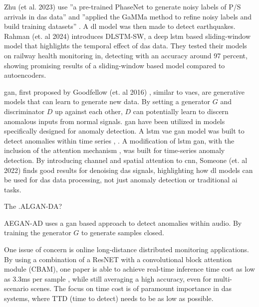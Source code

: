 Zhu (et al. 2023) use ''a pre-trained PhaseNet to generate noisy labels of P/S arrivals in \acrshort{das} data'' and ''applied the GaMMa method to refine noisy labels and build training datasets'' \cite{zhu2023seismic}. A \acrshort{dl} model was then made to detect earthquakes. \\

Rahman (et. al 2024) \cite{10.1115/JRC2024-124137} introduces DLSTM-SW, a deep \acrfull{lstm} based sliding-window model that highlights the temporal effect of \acrshort{das} data. They tested their models on railway health monitoring in, detecting with an accuracy around 97 percent, showing promising results of a sliding-window based model compared to autoencoders.

\acrshort{gan}, first proposed by Goodfellow (et. al 2016) \cite{goodfellow2016nips}, similar to \acrshort{vae}s, are generative models that can learn to generate new data. By setting a generator $G$ and discriminator $D$ up against each other, $D$ can potentially learn to discern anomalous inputs from normal signals. \acrshort{gan} have been utilized in models specifically designed for anomaly detection. A \acrshort{lstm} \acrshort{vae} \acrshort{gan} model was built to detect anomalies within time series \cite{s20133738}, .  A modification of \acrshort{lstm} \acrshort{gan}, with the inclusion of the attention mechanism \cite{vaswani2017attention}, was built for time-series anomaly detection. By introducing channel and spatial attention to \acrshort{cnn}, Someone (et. al 2022) \cite{eage:/content/journals/10.1111/1365-2478.13355} finds good results for denoising \acrshort{das} signals, highlighting how \acrshort{dl} models can be used for \acrshort{das} data processing, not just anomaly detection or traditional \acrshort{ai} tasks. 

The  \cite{bashar2023algan}.ALGAN-DA?

AEGAN-AD \cite{jiang2023unsupervised} uses a \acrshort{gan} based approach to detect anomalies within audio. By training the generator $G$ to generate samples closed. 


One issue of concern is online long-distance distributed monitoring applications. By using a combination of a ResNET with a convolutional block attention module (CBAM), one paper is able to achieve real-time inference time cost as low as 3.3ms per sample \cite{photonics9100677}, while still averaging a high accuracy, even for multi-scenario scenes. The focus on time cost is of paramount importance in \acrshort{das} systems, where TTD (time to detect) needs to be as low as possible.


